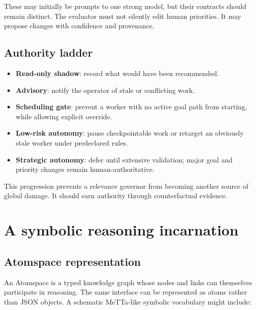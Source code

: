 \documentclass[11pt,letterpaper]{article}
\newcommand{\term}[1]{\textbf{#1}}
\begin{document}
These may initially be prompts to one strong model, but their contracts should
remain distinct. The evaluator must not silently edit human priorities. It may
propose changes with confidence and provenance.

\subsection{Authority ladder}

\begin{itemize}
  \item \term{Read-only shadow}: record what would have been recommended.
  \item \term{Advisory}: notify the operator of stale or conflicting work.
  \item \term{Scheduling gate}: prevent a worker with no active goal path from
        starting, while allowing explicit override.
  \item \term{Low-risk autonomy}: pause checkpointable work or retarget an
        obviously stale worker under predeclared rules.
  \item \term{Strategic autonomy}: defer until extensive validation; major goal
        and priority changes remain human-authoritative.
\end{itemize}

This progression prevents a relevance governor from becoming another source
of global damage. It should earn authority through counterfactual evidence.

\section{A symbolic reasoning incarnation}

\subsection{Atomspace representation}

An Atomspace is a typed knowledge graph whose nodes and links can themselves
participate in reasoning. The same interface can be represented as atoms
rather than JSON objects. A schematic MeTTa-like symbolic vocabulary might
include:
\end{document}
